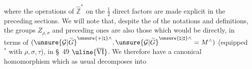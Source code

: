 where the operations of $\widehat{\mathbb Z}^{*}$ on the
$\frac12$ direct factors are made explicit in the preceding sections.
We will note that, despite the  of the
notations and definitions, the  groups
$Z_{\rho,\sigma}$ and preceding ones are also those which would be
 
directly, in terms of
$(\unsure{\mathcal G|\widetilde G}^{\unsure{+|\natural}\wedge},
\unsure{\mathcal G|\widetilde G}^{\unsure{\natural|\sharp}\wedge}
=M^{\wedge})$
(equipped$^{*}$ with $\rho,\sigma,\tau$), in \S\ 49 $\uline{\overline{\mathrm{VI}}}$.
We therefore have a canonical homomorphism
\diagram{\[
(217)\qquad
\left\{\begin{gathered}
\begin{tikzcd}[ampersand replacement=\&,column sep=5em,row sep=2.5em]
M=\unsure{N|\mathcal N}_{1,1}^{\text{ét}}
\arrow[r]\arrow[d,phantom,"\cup" description]
\& M_{\rho,\sigma}^{\sim}\arrow[d,phantom,"\cup" description]
\\
M^{!}\arrow[r] \& M_{\rho,\sigma}^{\sim\unsure{\natural|\sharp}}
\end{tikzcd}
\end{gathered}\right.
\]}
which as usual decomposes into
